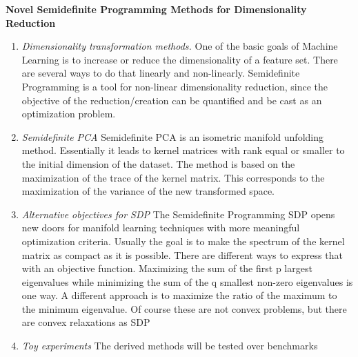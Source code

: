 \documentclass[times, 12pt,onecolumn]{article}
\begin{document}
\begin{center}
    \textbf{Novel Semidefinite Programming Methods for Dimensionality Reduction}
\end{center}
\begin{enumerate}
  \item \textit{Dimensionality transformation methods.} One of the basic goals of Machine Learning is to increase or reduce  the dimensionality of a feature set. There are several ways to do that linearly and non-linearly. Semidefinite Programming is a tool for non-linear dimensionality reduction, since the objective of the reduction/creation can be quantified and be cast as an optimization problem.
  \item \textit{Semidefinite PCA} Semidefinite PCA is an isometric manifold unfolding method. Essentially it leads to kernel matrices with rank equal or smaller to the initial dimension of the dataset. The method is based on the maximization of the trace of the kernel matrix. This corresponds to the maximization of the variance of the new transformed space.
  \item \textit{Alternative objectives for SDP} The Semidefinite Programming SDP opens new doors for manifold learning techniques with more meaningful optimization criteria. Usually the goal is to make the spectrum of the kernel matrix as compact as it is possible. There are different ways to express that with an objective function. Maximizing the sum of the first p largest eigenvalues while minimizing the sum of the q smallest non-zero eigenvalues is one way. A different approach is to maximize the ratio of the maximum to the minimum eigenvalue. Of course these are not convex problems, but there are convex relaxations as SDP
  \item \textit{Toy experiments} The derived methods will be tested over benchmarks
\end{enumerate}

\newpage
\end{document}
